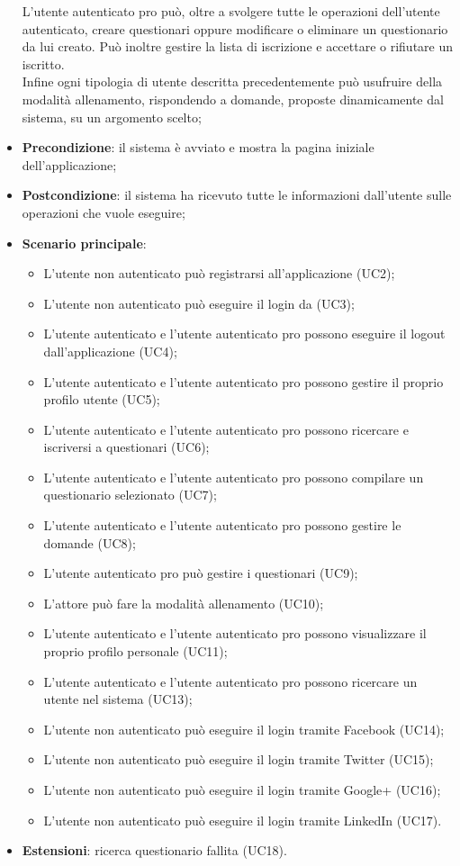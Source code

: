 \begin{itemize}
L'utente autenticato pro può, oltre a svolgere tutte le operazioni dell'utente autenticato, creare questionari oppure modificare o eliminare un questionario da lui creato. Può inoltre gestire la lista di iscrizione e accettare o rifiutare un iscritto.
\\ Infine ogni tipologia di utente descritta precedentemente può usufruire della modalità allenamento, rispondendo a domande, proposte dinamicamente dal sistema, su un argomento scelto;
\item\textbf{Precondizione}: il sistema è avviato e mostra la pagina iniziale dell'applicazione;
\item\textbf{Postcondizione}: il sistema ha ricevuto tutte le informazioni dall'utente sulle operazioni che vuole eseguire;
\item\textbf{Scenario principale}:
\begin{itemize}
\item L'utente non autenticato può registrarsi all'applicazione (UC2);
\item L'utente non autenticato può eseguire il login da \progetto (UC3);
\item L'utente autenticato e l'utente autenticato pro possono eseguire il logout dall'applicazione (UC4); 
\item L'utente autenticato e l'utente autenticato pro possono gestire il proprio profilo utente (UC5);
\item L'utente autenticato e l'utente autenticato pro possono ricercare e iscriversi a questionari (UC6);
\item L'utente autenticato e l'utente autenticato pro possono compilare un questionario selezionato (UC7);
\item L'utente autenticato e l'utente autenticato pro possono gestire le domande (UC8);
\item L'utente autenticato pro può gestire i questionari (UC9);
\item L'attore può fare la modalità allenamento (UC10);
\item L'utente autenticato e l'utente autenticato pro possono visualizzare il proprio profilo personale (UC11);
\item L'utente autenticato e l'utente autenticato pro possono ricercare un utente nel sistema (UC13);
\item L'utente non autenticato può eseguire il login tramite Facebook (UC14);
\item L'utente non autenticato può eseguire il login tramite Twitter (UC15);
\item L'utente non autenticato può eseguire il login tramite Google+ (UC16);
\item L'utente non autenticato può eseguire il login tramite LinkedIn (UC17).
\end{itemize}
\item\textbf{Estensioni}: ricerca questionario fallita (UC18). 
\end{itemize}